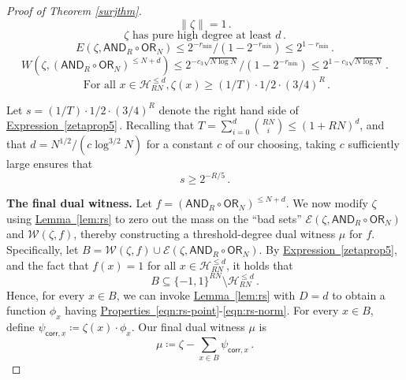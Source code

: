 \documentclass[11pt]{article}
\numberwithin{equation}{section}
\theoremstyle{definition}
\theoremstyle{plain}
\newcommand{\expref}[2]{\hyperref[#2]{#1~\ref{#2}}}
\newcommand{\expeqref}[2]{\hyperref[#2]{#1~\eqref{#2}}}
\newcommand{\OR}{\mathsf{ OR}}
\newcommand{\bits}{\{-1,1\}}
\newcommand{\AND}{\mathsf{AND}}
\begin{document}
\begin{proof}[Proof of Theorem \ref{surjthm}]
	\begin{equation}
	\label{zetaprop1} \|\zeta\|=1\,.
	\end{equation}
	\begin{equation}
	\label{zetaprop2}
	\zeta \text{ has pure high degree at least } d\,.
	\end{equation}
	\begin{equation}
	\label{zetapropr3}
	E\left(\zeta, \AND_R \circ \OR_N\right) \leq 2^{-r_{\text{min}}}/\left(1-2^{-r_{\text{min}}}\right) \leq  2^{1-r_{\text{min}}}\,.
	\end{equation}
	\begin{equation}
	\label{zetaprop4}
	W\left(\zeta, \left(\AND_R \circ \OR_N\right)^{\leq N+d}\right) \leq 2^{-c_3 \sqrt{N \log N}}/(1-2^{-r_{\text{min}}}) \leq 2^{1-c_3 \sqrt{N \log N}}\,.
	\end{equation}
	\begin{equation}
	\label{zetaprop5}
	\text{ For all } x \in \mathcal{H}^{\leq d}_{RN}, \zeta(x) \geq (1/T) \cdot 1/2 \cdot (3/4)^{R}\,.
	\end{equation}
	
	Let $s = (1/T) \cdot 1/2 \cdot (3/4)^R$ denote the right hand side of \expeqref{Expression}{zetaprop5}\,. 
Recalling that $T=\sum_{i=0}^{d} {RN \choose i} \leq (1+RN)^d$, and that $d=N^{1/2}/(c \log^{3/2} N)$ for a constant $c$ of our choosing, 
	taking $c$ sufficiently large ensures that 
	\begin{equation} \label{zeq} s \geq 2^{-R/5}\,. \end{equation}
	
	
	
	\medskip
	\noindent \textbf{The final dual witness.} Let $f=\left(\AND_R \circ \OR_N\right)^{\leq N+d}$. We now modify $\zeta$ using \expref{Lemma}{lem:rs} to zero out the mass on the ``bad sets'' $\mathcal{E}(\zeta, \AND_R \circ \OR_N)$ and $\mathcal{W}(\zeta, f)$,
	thereby constructing a %
	threshold-degree %
	 dual witness $\mu$ for $f$. 
	Specifically, let $B=\mathcal{W}(\zeta, f) \cup \mathcal{E}(\zeta, \AND_R \circ \OR_N)$.
	By \expeqref{Expression}{zetaprop5},
	and the fact that $f(x) =1$ for all $x \in \mathcal{H}_{RN}^{\leq d}$,
	it holds that 
	\begin{equation}
	\label{subseteq} B \subseteq \bits^{RN}\setminus \mathcal{H}_{RN}^{\leq d}\,.
	\end{equation}
	Hence, for every $x \in B$, we can invoke \expref{Lemma}{lem:rs} with $D=d$ to
	obtain a function $\phi_x$ having  %
	\expeqref{Properties}{eqn:rs-point}-\eqref{eqn:rs-norm}.
	For every $x \in B$, 
	define $\psi_{\mathsf{corr}, x} \coloneqq  \zeta(x) \cdot \phi_x$. %
	Our final dual witness $\mu$ is 
	\begin{equation} \mu \coloneqq  \zeta - \sum_{x \in B} \psi_{\mathsf{corr}, x}\,. \label{omg1}\end{equation}
	

\end{proof}
\end{document}

